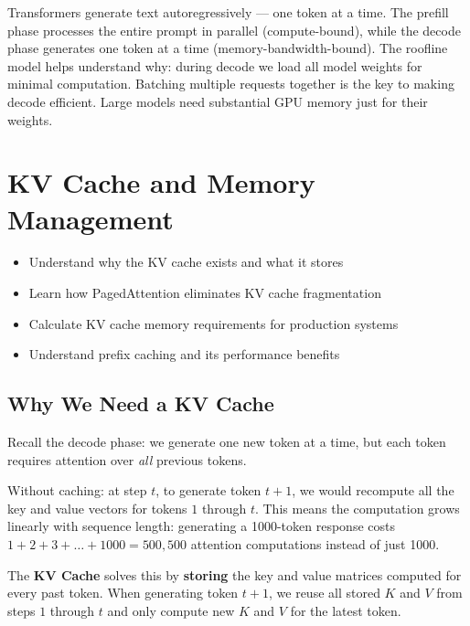 \documentclass[10pt, oneside, openany]{book}
\newenvironment{learningobjectives}
  {\begin{tcolorbox}[enhanced, breakable,
    colback={rgb,255:red,232;green,240;blue,255},
    colframe=NavyBlue, boxrule=1.5pt, arc=4pt,
    title={\bfseries Learning Objectives},
    fonttitle=\bfseries\color{white},
    attach boxed title to top left={yshift=-2mm, xshift=5mm},
    boxed title style={colback=NavyBlue, arc=2pt}]
  \begin{itemize}[leftmargin=1.5em, itemsep=2pt]}
  {\end{itemize}\end{tcolorbox}}
\newenvironment{chapsummary}
  {\begin{tcolorbox}[enhanced, breakable,
    colback={rgb,255:red,245;green,245;blue,225},
    colframe=AccentOrange, boxrule=1.5pt, arc=4pt,
    title={\bfseries Chapter Summary},
    fonttitle=\bfseries\color{white},
    attach boxed title to top left={yshift=-2mm, xshift=5mm},
    boxed title style={colback=AccentOrange, arc=2pt}]}
  {\end{tcolorbox}}
\newcommand{\keyterm}[1]{\textbf{\color{AccentOrange}#1}}
\begin{document}
\begin{chapsummary}
Transformers generate text autoregressively --- one token at a time.  The prefill
phase processes the entire prompt in parallel (compute-bound), while the decode
phase generates one token at a time (memory-bandwidth-bound).  The roofline model
helps understand why: during decode we load all model weights for minimal
computation.  Batching multiple requests together is the key to making decode
efficient.  Large models need substantial GPU memory just for their weights.
\end{chapsummary}

\chapter{KV Cache and Memory Management}
\label{ch:kvcache}

\begin{learningobjectives}
  \item Understand why the KV cache exists and what it stores
  \item Learn how PagedAttention eliminates KV cache fragmentation
  \item Calculate KV cache memory requirements for production systems
  \item Understand prefix caching and its performance benefits
\end{learningobjectives}

\section{Why We Need a KV Cache}

Recall the decode phase: we generate one new token at a time, but each token
requires attention over \emph{all} previous tokens.

Without caching: at step $t$, to generate token $t+1$, we would recompute
all the key and value vectors for tokens $1$ through $t$.  This means
the computation grows linearly with sequence length: generating a 1000-token
response costs $1+2+3+\ldots+1000 = 500{,}500$ attention computations instead
of just 1000.

The \keyterm{KV Cache} solves this by \textbf{storing} the key
and value matrices computed for every past token.  When generating token $t+1$,
we reuse all stored $K$ and $V$ from steps $1$ through $t$ and only compute
new $K$ and $V$ for the latest token.
\end{document}

